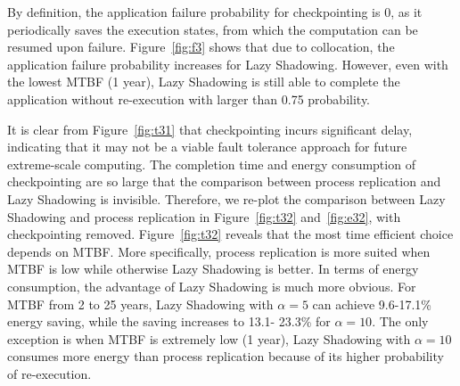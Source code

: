 By definition, the application failure probability for checkpointing is 0, as it periodically saves the execution states, from which the computation can be resumed upon failure. Figure~\ref{fig:f3} shows that due to collocation, the application failure probability increases for Lazy Shadowing. However, even with the lowest MTBF (1 year), Lazy Shadowing is still able to complete the application without re-execution with larger than 0.75 probability. 

It is clear from Figure~\ref{fig:t31} that checkpointing incurs significant delay, indicating that it may not be a viable fault tolerance approach for future extreme-scale computing. The completion time and energy consumption of checkpointing are so large that the comparison between process replication and Lazy Shadowing is invisible. Therefore, we re-plot the comparison between Lazy Shadowing and process replication in Figure~\ref{fig:t32} and~\ref{fig:e32}, with checkpointing removed. Figure~\ref{fig:t32} reveals that the most time efficient choice depends on MTBF. More specifically, process replication is more suited when MTBF is low while otherwise Lazy Shadowing is better. In terms of energy consumption, the advantage of Lazy Shadowing is much more obvious. For MTBF from 2 to 25 years, Lazy Shadowing with $\alpha=5$ can achieve 9.6-17.1\% energy saving, while the saving increases to 13.1- 23.3\% for $\alpha=10$. The only exception is when MTBF is extremely low (1 year), Lazy Shadowing with $\alpha=10$ consumes more energy than process replication because of its higher probability of re-execution.






